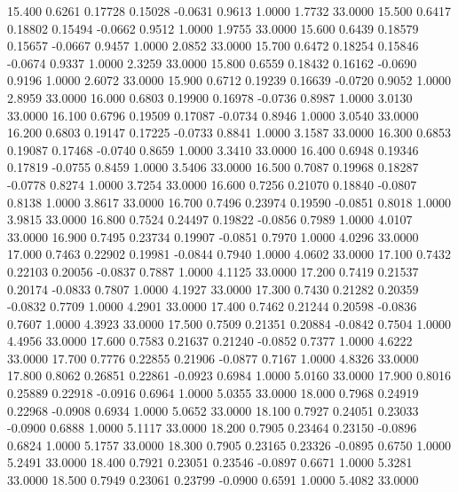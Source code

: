   15.400   0.6261   0.17728   0.15028  -0.0631   0.9613   1.0000   1.7732  33.0000
  15.500   0.6417   0.18802   0.15494  -0.0662   0.9512   1.0000   1.9755  33.0000
  15.600   0.6439   0.18579   0.15657  -0.0667   0.9457   1.0000   2.0852  33.0000
  15.700   0.6472   0.18254   0.15846  -0.0674   0.9337   1.0000   2.3259  33.0000
  15.800   0.6559   0.18432   0.16162  -0.0690   0.9196   1.0000   2.6072  33.0000
  15.900   0.6712   0.19239   0.16639  -0.0720   0.9052   1.0000   2.8959  33.0000
  16.000   0.6803   0.19900   0.16978  -0.0736   0.8987   1.0000   3.0130  33.0000
  16.100   0.6796   0.19509   0.17087  -0.0734   0.8946   1.0000   3.0540  33.0000
  16.200   0.6803   0.19147   0.17225  -0.0733   0.8841   1.0000   3.1587  33.0000
  16.300   0.6853   0.19087   0.17468  -0.0740   0.8659   1.0000   3.3410  33.0000
  16.400   0.6948   0.19346   0.17819  -0.0755   0.8459   1.0000   3.5406  33.0000
  16.500   0.7087   0.19968   0.18287  -0.0778   0.8274   1.0000   3.7254  33.0000
  16.600   0.7256   0.21070   0.18840  -0.0807   0.8138   1.0000   3.8617  33.0000
  16.700   0.7496   0.23974   0.19590  -0.0851   0.8018   1.0000   3.9815  33.0000
  16.800   0.7524   0.24497   0.19822  -0.0856   0.7989   1.0000   4.0107  33.0000
  16.900   0.7495   0.23734   0.19907  -0.0851   0.7970   1.0000   4.0296  33.0000
  17.000   0.7463   0.22902   0.19981  -0.0844   0.7940   1.0000   4.0602  33.0000
  17.100   0.7432   0.22103   0.20056  -0.0837   0.7887   1.0000   4.1125  33.0000
  17.200   0.7419   0.21537   0.20174  -0.0833   0.7807   1.0000   4.1927  33.0000
  17.300   0.7430   0.21282   0.20359  -0.0832   0.7709   1.0000   4.2901  33.0000
  17.400   0.7462   0.21244   0.20598  -0.0836   0.7607   1.0000   4.3923  33.0000
  17.500   0.7509   0.21351   0.20884  -0.0842   0.7504   1.0000   4.4956  33.0000
  17.600   0.7583   0.21637   0.21240  -0.0852   0.7377   1.0000   4.6222  33.0000
  17.700   0.7776   0.22855   0.21906  -0.0877   0.7167   1.0000   4.8326  33.0000
  17.800   0.8062   0.26851   0.22861  -0.0923   0.6984   1.0000   5.0160  33.0000
  17.900   0.8016   0.25889   0.22918  -0.0916   0.6964   1.0000   5.0355  33.0000
  18.000   0.7968   0.24919   0.22968  -0.0908   0.6934   1.0000   5.0652  33.0000
  18.100   0.7927   0.24051   0.23033  -0.0900   0.6888   1.0000   5.1117  33.0000
  18.200   0.7905   0.23464   0.23150  -0.0896   0.6824   1.0000   5.1757  33.0000
  18.300   0.7905   0.23165   0.23326  -0.0895   0.6750   1.0000   5.2491  33.0000
  18.400   0.7921   0.23051   0.23546  -0.0897   0.6671   1.0000   5.3281  33.0000
  18.500   0.7949   0.23061   0.23799  -0.0900   0.6591   1.0000   5.4082  33.0000
